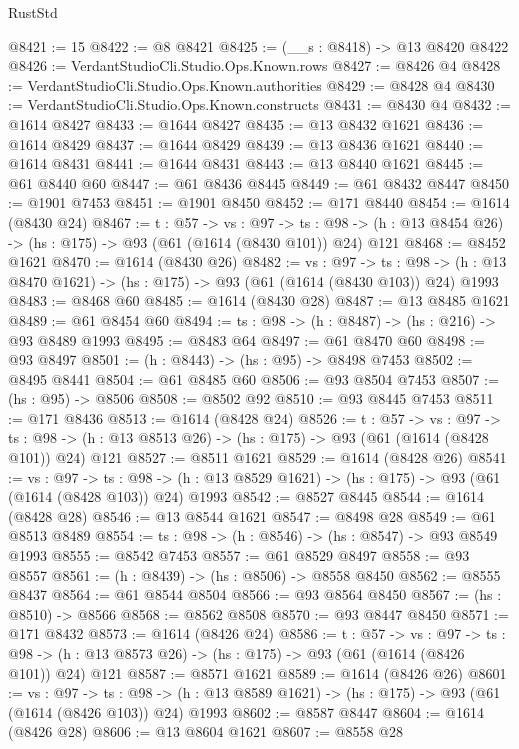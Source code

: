 \begin{lexlean}{RustStd}
\begin{coremodule}
@8421 := 15
@8422 := @8 @8421
@8425 := (__s : @8418) -> @13 @8420 @8422
@8426 := VerdantStudioCli.Studio.Ops.Known.rows
@8427 := @8426 @4
@8428 := VerdantStudioCli.Studio.Ops.Known.authorities
@8429 := @8428 @4
@8430 := VerdantStudioCli.Studio.Ops.Known.constructs
@8431 := @8430 @4
@8432 := @1614 @8427
@8433 := @1644 @8427
@8435 := @13 @8432 @1621
@8436 := @1614 @8429
@8437 := @1644 @8429
@8439 := @13 @8436 @1621
@8440 := @1614 @8431
@8441 := @1644 @8431
@8443 := @13 @8440 @1621
@8445 := @61 @8440 @60
@8447 := @61 @8436 @8445
@8449 := @61 @8432 @8447
@8450 := @1901 @7453
@8451 := @1901 @8450
@8452 := @171 @8440
@8454 := @1614 (@8430 @24)
@8467 := {t : @57} ->
  {vs : @97} ->
  {ts : @98} -> (h : @13 @8454 @26) -> (hs : @175) -> @93 (@61 (@1614 (@8430 @101)) @24) @121
@8468 := @8452 @1621
@8470 := @1614 (@8430 @26)
@8482 := {vs : @97} ->
  {ts : @98} -> (h : @13 @8470 @1621) -> (hs : @175) -> @93 (@61 (@1614 (@8430 @103)) @24) @1993
@8483 := @8468 @60
@8485 := @1614 (@8430 @28)
@8487 := @13 @8485 @1621
@8489 := @61 @8454 @60
@8494 := {ts : @98} -> (h : @8487) -> (hs : @216) -> @93 @8489 @1993
@8495 := @8483 @64
@8497 := @61 @8470 @60
@8498 := @93 @8497
@8501 := (h : @8443) -> (hs : @95) -> @8498 @7453
@8502 := @8495 @8441
@8504 := @61 @8485 @60
@8506 := @93 @8504 @7453
@8507 := (hs : @95) -> @8506
@8508 := @8502 @92
@8510 := @93 @8445 @7453
@8511 := @171 @8436
@8513 := @1614 (@8428 @24)
@8526 := {t : @57} ->
  {vs : @97} ->
  {ts : @98} -> (h : @13 @8513 @26) -> (hs : @175) -> @93 (@61 (@1614 (@8428 @101)) @24) @121
@8527 := @8511 @1621
@8529 := @1614 (@8428 @26)
@8541 := {vs : @97} ->
  {ts : @98} -> (h : @13 @8529 @1621) -> (hs : @175) -> @93 (@61 (@1614 (@8428 @103)) @24) @1993
@8542 := @8527 @8445
@8544 := @1614 (@8428 @28)
@8546 := @13 @8544 @1621
@8547 := @8498 @28
@8549 := @61 @8513 @8489
@8554 := {ts : @98} -> (h : @8546) -> (hs : @8547) -> @93 @8549 @1993
@8555 := @8542 @7453
@8557 := @61 @8529 @8497
@8558 := @93 @8557
@8561 := (h : @8439) -> (hs : @8506) -> @8558 @8450
@8562 := @8555 @8437
@8564 := @61 @8544 @8504
@8566 := @93 @8564 @8450
@8567 := (hs : @8510) -> @8566
@8568 := @8562 @8508
@8570 := @93 @8447 @8450
@8571 := @171 @8432
@8573 := @1614 (@8426 @24)
@8586 := {t : @57} ->
  {vs : @97} ->
  {ts : @98} -> (h : @13 @8573 @26) -> (hs : @175) -> @93 (@61 (@1614 (@8426 @101)) @24) @121
@8587 := @8571 @1621
@8589 := @1614 (@8426 @26)
@8601 := {vs : @97} ->
  {ts : @98} -> (h : @13 @8589 @1621) -> (hs : @175) -> @93 (@61 (@1614 (@8426 @103)) @24) @1993
@8602 := @8587 @8447
@8604 := @1614 (@8426 @28)
@8606 := @13 @8604 @1621
@8607 := @8558 @28

\end{coremodule}
\end{lexlean}
